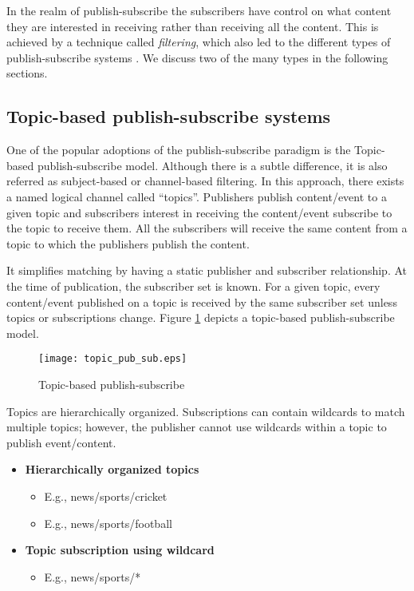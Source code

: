 In the realm of publish-subscribe the subscribers have control on what content they are interested in receiving rather than receiving all the content. This is achieved by a technique called \textit {filtering}, which also led to the different types of publish-subscribe systems \parencite{Eugster:2003:MFP:857076.857078}. We discuss two of the many types in the following sections.

\subsection{Topic-based publish-subscribe systems}

One of the popular adoptions of the publish-subscribe paradigm is the Topic-based publish-subscribe model. Although there is a subtle difference, it is also referred as subject-based or channel-based filtering. In this approach, there exists a named logical channel called \enquote{topics}. Publishers publish content/event to a given topic and subscribers interest in receiving the content/event subscribe to the topic to receive them. All the subscribers will receive the same content from a topic to which the publishers publish the content. 

It simplifies matching by having a static publisher and subscriber relationship. At the time of publication, the subscriber set is known. For a given topic, every content/event published on a topic is received by the same subscriber set unless topics or subscriptions change. Figure \ref{figures:topic_pub_sub} depicts a topic-based publish-subscribe model.

    \makeatletter
    \setlength{\intextsep}{20pt}
    \makeatother

    \begin{figure}[h!]
    \centering
    \texttt{[image: topic\_pub\_sub.eps]}
    \caption{Topic-based publish-subscribe}\label{figures:topic_pub_sub}
    \end{figure}

Topics are hierarchically organized. Subscriptions can contain wildcards to match multiple topics; however, the publisher cannot use wildcards within a topic to publish event/content.

\begin{itemize}
\item[]\textbf{Hierarchically organized topics}
    \begin{itemize}
    \item E.g., news/sports/cricket
    \item E.g., news/sports/football
    \end{itemize}

\item[]\textbf{Topic subscription using wildcard}
    \begin{itemize}
    \item E.g., news/sports/*
    \end{itemize}
\end{itemize}



